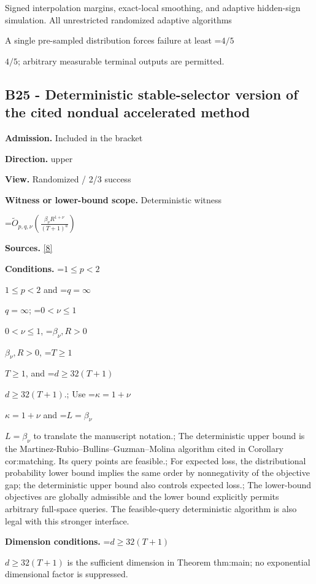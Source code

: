 \documentclass[10pt,a4paper]{article}
\newcommand{\AtlasMath}[1]{\par\begingroup\centering\setbox0=\hbox{$\displaystyle #1$}\ifdim\wd0>1.4\linewidth\typeout{ATLAS WIDE FORMULA: \the\wd0}\fi\ifdim\wd0>\linewidth\resizebox{\linewidth}{!}{\box0}\else\box0\fi\par\endgroup}
\newcommand{\AtlasInlineMath}[1]{\begingroup\setbox0=\hbox{$#1$}\ifdim\wd0>.4\linewidth\endgroup\AtlasMath{#1}\else\endgroup$#1$\fi}
\begin{document}
Signed interpolation margins, exact-local smoothing, and adaptive hidden-sign simulation. All unrestricted randomized adaptive algorithms



A single pre-sampled distribution forces failure at least \AtlasInlineMath{4/5}; arbitrary measurable terminal outputs are permitted.



\subsection{B25 - Deterministic stable-selector version of the cited nondual accelerated method}


\textbf{Admission.} Included in the bracket



\textbf{Direction.} upper



\textbf{View.} Randomized / 2/3 success



\textbf{Witness or lower-bound scope.} Deterministic witness



\AtlasMath{\widetilde O_{p,q,\nu}\!\left(\frac{\beta_\nu R^{1+\nu}}{(T+1)^a}\right)}


\textbf{Sources.} \href{https://github.com/WU-Wendao/Colombo/blob/main/colombo_sensorium/Complexity_altas/data/sources/colombo/B1/manuscript.pdf}{[8]}



\textbf{Conditions.} \AtlasInlineMath{1\le p<2} and \AtlasInlineMath{q=\infty}; \AtlasInlineMath{0<\nu\le1}, \AtlasInlineMath{\beta_\nu,R>0}, \AtlasInlineMath{T\ge1}, and \AtlasInlineMath{d\ge32(T+1)}.; Use \AtlasInlineMath{\kappa=1+\nu} and \AtlasInlineMath{L=\beta_\nu} to translate the manuscript notation.; The deterministic upper bound is the Martinez-Rubio--Bullins--Guzman--Molina algorithm cited in Corollary cor:matching. Its query points are feasible.; For expected loss, the distributional probability lower bound implies the same order by nonnegativity of the objective gap; the deterministic upper bound also controls expected loss.; The lower-bound objectives are globally admissible and the lower bound explicitly permits arbitrary full-space queries. The feasible-query deterministic algorithm is also legal with this stronger interface.



\textbf{Dimension conditions.} \AtlasInlineMath{d\ge32(T+1)} is the sufficient dimension in Theorem thm:main; no exponential dimensional factor is suppressed.
\end{document}
